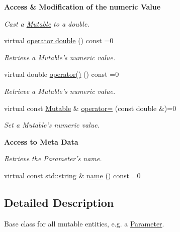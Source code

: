 \begin{Indent}{\bf Access \& Modification of the numeric Value}\par
{\em \label{_amgrp90084f10ec361c9fc454efe770eda260}
 Cast a \hyperlink{classeos_1_1Mutable}{Mutable} to a double. }\begin{DoxyCompactItemize}
\item 
virtual \hyperlink{classeos_1_1Mutable_a0763bf2933503db18d28b942aae2d324}{operator double} () const =0
\begin{DoxyCompactList}\small\item\em Retrieve a Mutable's numeric value. \item\end{DoxyCompactList}\item 
virtual double \hyperlink{classeos_1_1Mutable_a6efd15ab0164a1735813669506e331d7}{operator()} () const =0
\begin{DoxyCompactList}\small\item\em Retrieve a Mutable's numeric value. \item\end{DoxyCompactList}\item 
virtual const \hyperlink{classeos_1_1Mutable}{Mutable} \& \hyperlink{classeos_1_1Mutable_abf079592435ecb22f242b7b01c279c72}{operator=} (const double \&)=0
\begin{DoxyCompactList}\small\item\em Set a Mutable's numeric value. \item\end{DoxyCompactList}\end{DoxyCompactItemize}
\end{Indent}
\begin{Indent}{\bf Access to Meta Data}\par
{\em \label{_amgrpa3a190e9d66c82f98a9d3e29998edf0d}
 Retrieve the Parameter's name. }\begin{DoxyCompactItemize}
\item 
virtual const std::string \& \hyperlink{classeos_1_1Mutable_ad215a3863435593930a3543866881f49}{name} () const =0
\end{DoxyCompactItemize}
\end{Indent}


\subsection{Detailed Description}
Base class for all mutable entities, e.g. a \hyperlink{classeos_1_1Parameter}{Parameter}. 

